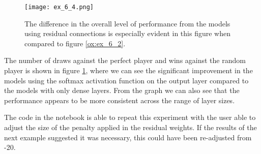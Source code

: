 \documentclass{somasmsc}
\begin{document}
\begin{exa}
\begin{figure}[H]\label{ox:ex_6_4}
\begin{center}
\texttt{[image: ex\_6\_4.png]}
\end{center}
\caption{The difference in the overall level of performance from the models using residual connections is especially evident in this figure when compared to figure \ref{ox:ex_6_2}.}
\end{figure}

The number of draws against the perfect player and wins against the random player is shown in figure \ref{ox:ex_6_4}, where we can see the significant improvement in the models using the softmax activation function on the output layer compared to the models with only dense layers. From the graph we can also see that the performance appears to be more consistent across the range of layer sizes.

The code in the notebook is able to repeat this experiment with the user able to adjust the size of the penalty applied in the residual weights. If the results of the next example suggested it was necessary, this could have been re-adjusted from -20.
\end{exa}
\end{document}
